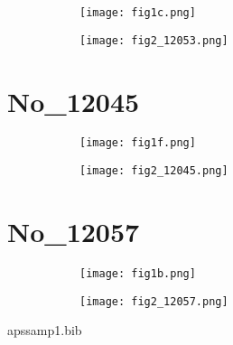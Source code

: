 \documentclass[%
 reprint,
 amsmath,amssymb,
 aps,
]{revtex4-2}
\begin{document}
\begin{figure}[b]

\centering

\quad
    \begin{subfigure}[b]{0.45\textwidth}
    \centering
    \texttt{[image: fig1c.png]}
    \caption{\label{fig:fig1c.png}}
    \end{subfigure}
\quad
    \begin{subfigure}[b]{0.45\textwidth}
    \centering
    \texttt{[image: fig2\_12053.png]}
    \caption{\label{fig:fig2_12053.png}}
    \end{subfigure}


\captionsetup{justification=raggedright,singlelinecheck=false}
\caption{\label{fig:fig1c.png}}

\end{figure}



\section{No_12045}

\begin{figure}[b]

\centering

\quad
    \begin{subfigure}[b]{0.45\textwidth}
    \centering
    \texttt{[image: fig1f.png]}
    \caption{\label{fig:fig1f.png}}
    \end{subfigure}
\quad
    \begin{subfigure}[b]{0.45\textwidth}
    \centering
    \texttt{[image: fig2\_12045.png]}
    \caption{\label{fig:fig2_12045.png}}
    \end{subfigure}


\captionsetup{justification=raggedright,singlelinecheck=false}
\caption{\label{fig:fig1f.png}}

\end{figure}



\section{No_12057}

\begin{figure}[b]

\centering

\quad
    \begin{subfigure}[b]{0.45\textwidth}
    \centering
    \texttt{[image: fig1b.png]}
    \caption{\label{fig:fig1b.png}}
    \end{subfigure}
\quad
    \begin{subfigure}[b]{0.45\textwidth}
    \centering
    \texttt{[image: fig2\_12057.png]}
    \caption{\label{fig:fig2_12057.png}}
    \end{subfigure}


\captionsetup{justification=raggedright,singlelinecheck=false}
\caption{\label{fig:fig1b.png}}

\end{figure}






\nocite{*}



\begin{filecontents}{apssamp1.bib}

\end{filecontents}
\end{document}
